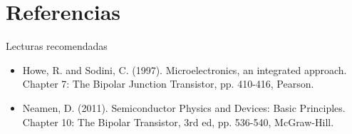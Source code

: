 \documentclass[t,aspectratio=169]{beamer}
\begin{document}
\section{Referencias}
\begin{frame}{Lecturas recomendadas}

\begin{itemize}
\item Howe, R. and Sodini, C. (1997). Microelectronics, an integrated approach. Chapter 7: The Bipolar Junction Transistor, pp. 410-416, Pearson.
\item Neamen, D. (2011). Semiconductor Physics and Devices: Basic Principles. Chapter 10: The Bipolar Transistor, 3rd ed, pp. 536-540, McGraw-Hill.
\end{itemize}

\end{frame}
\end{document}
